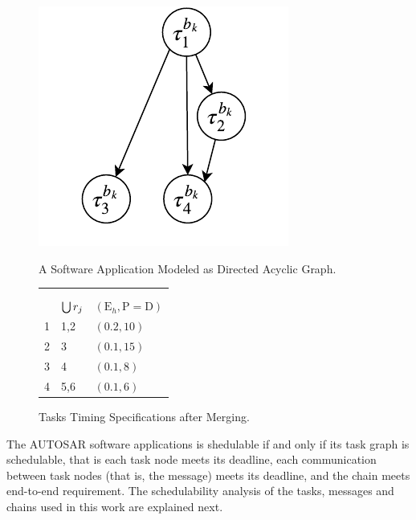 \begin{figure}
\vspace{0pt}\raggedbottom
	\begin{minipage}{.475\textwidth}
		\centering
		\includegraphics[width=0.6\linewidth]{img/dag_tasks}
		\caption{A Software Application Modeled as Directed Acyclic Graph.}
		\label{fig_dag_tasks}
	\end{minipage}%
\hfill
	\begin{minipage}{0.475\textwidth}
	\centering
		\begin{tabular}{@{}lll@{}}
						&&\\
			&&\\
			\toprule
			\ttssb{\tau}&$\bigcup\ssb{r}[j]$&$(\mathrm{E}_h, \mathrm{P=D})$ \\ 
			\midrule
			1 & 1,2 &  $(0.2,10)$\\ 
			2& 3 &  $(0.1,15)$\\ 
			3& 4&  $(0.1,8)$\\ 
			4 & 5,6 &  $(0.1,6)$\\ 

			\bottomrule 
		\end{tabular}
		\caption{Tasks Timing Specifications after Merging.}
		\label{tbl_tasks_specs}
	\end{minipage}
\end{figure}


The AUTOSAR software applications is shedulable if and only if its task graph is schedulable, that is each task node meets its deadline, each communication between task nodes (that is, the message) meets its deadline, and the chain meets end-to-end requirement. The schedulability analysis of the tasks, messages and chains used in this work are explained next.

